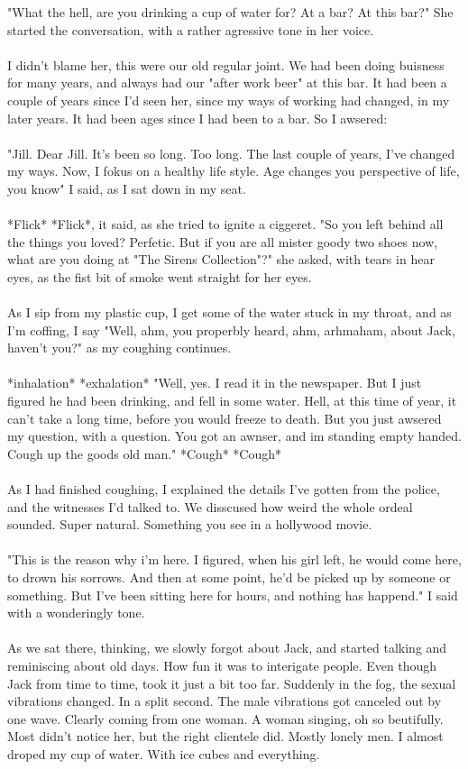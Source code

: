 \documentclass[]{article}
\begin{document}
	"What the hell, are you drinking a cup of water for? At a bar? At this bar?" She started the conversation, with a rather agressive tone in her voice.
	\\ \\
	I didn't blame her, this were our old regular joint. We had been doing buisness for many years, and always had our "after work beer" at this bar. It had been a couple of years since I'd seen her, since my ways of working had changed, in my later years. It had been ages since I had been to a bar. So I awsered:
	\\ \\
	"Jill. Dear Jill. It's been so long. Too long. The last couple of years, I've changed my ways. Now, I fokus on a healthy life style. Age changes you perspective of life, you know" I said, as I sat down in my seat.
	\\ \\
	*Flick* *Flick*, it said, as she tried to ignite a ciggeret. "So you left behind all the things you loved? Perfetic. But if you are all mister goody two shoes now, what are you doing at "The Sirens Collection"?" she asked, with tears in hear eyes, as the fist bit of smoke went straight for her eyes.
	\\ \\
	As I sip from my plastic cup, I get some of the water stuck in my throat, and as I'm coffing, I say "Well, ahm, you properbly heard, ahm, arhmaham, about Jack, haven't you?" as my coughing continues.
	\\ \\
	*inhalation* *exhalation* "Well, yes. I read it in the newspaper. But I just figured he had been drinking, and fell in some water. Hell, at this time of year, it can't take a long time, before you would freeze to death. But you just awsered my question, with a question. You got an awnser, and im standing empty handed. Cough up the goods old man." *Cough* *Cough*
	\\ \\
	As I had finished coughing, I explained the details I've gotten from the police, and the witnesses I'd talked to. We disscused how weird the whole ordeal sounded. Super natural. Something you see in a hollywood movie.
	\\ \\
	"This is the reason why i'm here. I figured, when his girl left, he would come here, to drown his sorrows. And then at some point, he'd be picked up by someone or something. But I've been sitting here for hours, and nothing has happend." I said with a wonderingly tone. 
	\\ \\
	As we sat there, thinking, we slowly forgot about Jack, and started talking and reminiscing about old days. How fun it was to interigate people. Even though Jack from time to time, took it just a bit too far. Suddenly in the fog, the sexual vibrations changed. In a split second. The male vibrations got canceled out by one wave. Clearly coming from one woman. A woman singing, oh so beutifully. Most didn't notice her, but the right clientele did. Mostly lonely men. I almost droped my cup of water. With ice cubes and everything.
	
\end{document}
